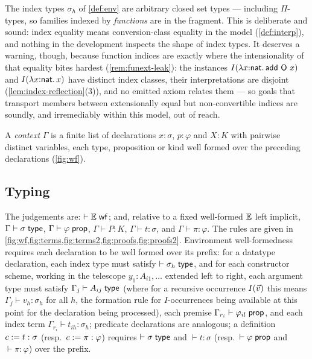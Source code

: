 \begin{remark}
\label{rem:function-index}
The index types $\sigma_h$ of \cref{def:env} are arbitrary closed set
types --- including $\Pi$-types, so families indexed by
\emph{functions} are in the fragment.  This is deliberate and sound:
index equality means conversion-class equality in the model
(\cref{def:interp}), and nothing in the development inspects the shape
of index types.  It deserves a warning, though, because function
indices are exactly where the intensionality of that equality bites
hardest (\cref{rem:funext-leak}): the instances $I(\lambda
x{:}\mathsf{nat}.\,\mathsf{add}\ \mathsf{O}\ x)$ and $I(\lambda x{:}\mathsf{nat}.\,x)$ have
distinct index classes, their interpretations are disjoint
(\cref{lem:index-reflection}(3)), and no emitted axiom relates them
--- so goals that transport members between extensionally equal but
non-convertible indices are soundly, and irremediably within this
model, out of reach.
\end{remark}

\begin{definition}[Contexts]
A \emph{context} $\Gamma$ is a finite list of declarations $x : \sigma$,
$p : \varphi$ and $X : K$ with pairwise distinct variables, each type,
proposition or kind well formed over the preceding declarations
(\cref{fig:wf}).
\end{definition}

\subsection{Typing}
\label{sec:calculus-typing}

The judgements are: $\vdash \mathbb{E} \;\mathsf{wf}$; and, relative to a fixed
well-formed $\mathbb{E}$ left implicit, $\Gamma \vdash \sigma \;\mathsf{type}$, $\Gamma
\vdash \varphi \;\mathsf{prop}$, $\Gamma \vdash P : K$, $\Gamma \vdash t :
\sigma$, and $\Gamma \vdash \pi : \varphi$.  The rules are given in
\cref{fig:wf,fig:terms,fig:terms2,fig:proofs,fig:proofs2}.  Environment well-formedness requires
each declaration to be well formed over its prefix: for a datatype
declaration, each index type must satisfy $\vdash \sigma_h \;\mathsf{type}$, and
for each constructor scheme, working in the telescope $y_1 : A_{i1},
\dots$ extended left to right, each argument type must satisfy $\Gamma_j
\vdash A_{ij} \;\mathsf{type}$ (where for a recursive occurrence $I(\vec{v})$ this
means $\Gamma_j \vdash v_h : \sigma_h$ for all $h$, the formation rule
for $I$-occurrences being available at this point for the declaration
being processed), each premise $\Gamma_{r_i} \vdash \varphi_{il}
\;\mathsf{prop}$, and each index term $\Gamma_{r_i} \vdash t_{ih} : \sigma_h$;
predicate declarations are analogous; a definition $c \mathrel{:=} t : \sigma$
(resp.\ $c \mathrel{:=} \pi : \varphi$) requires $\vdash \sigma \;\mathsf{type}$ and
$\vdash t : \sigma$ (resp.\ $\vdash \varphi \;\mathsf{prop}$ and $\vdash \pi :
\varphi$) over the prefix.

